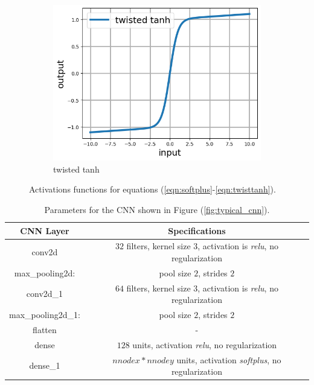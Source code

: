 \documentclass[12pt]{article}
\begin{document}
\begin{figure}[h]
\begin{subfigure}[b]{0.45\linewidth}
    \includegraphics[totalheight=4cm]{Figures/scripts/twistedtanh.png}
    \caption{twisted tanh}
  \end{subfigure}
\caption{\label{fig:activations} Activations functions for equations (\ref{eqn:softplus}-\ref{eqn:twisttanh}).}
\end{figure}
%
\begin{table}
  \centering
 \begin{tabular}{|c|c|}
   \hline
   CNN Layer & Specifications \\
   \hline
   conv2d    & $32$ filters, kernel size $3$, activation is \textit{relu}, no regularization\\
   \hline
   max\_pooling2d: & pool size $2$, strides $2$\\
   \hline
   conv2d\_1 & $64$ filters, kernel size $3$, activation is \textit{relu}, no regularization\\
   \hline
   max\_pooling2d\_1: & pool size $2$, strides $2$\\
   \hline
   flatten & -\\
   \hline
   dense   & $128$ units, activation \textit{relu}, no regularization\\
   \hline
   dense\_1 & $nnodex*nnodey$ units, activation \textit{softplus}, no regularization\\
   \hline
 \end{tabular}
 \caption{\label{tab:cnnparams} Parameters for the CNN shown in Figure (\ref{fig:typical_cnn}).}
\end{table}
%
\end{document}
